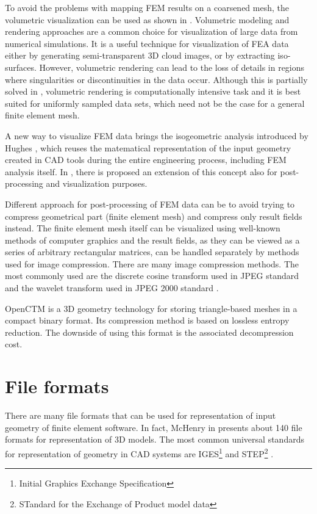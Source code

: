 To avoid the problems with mapping FEM results on a coarsened mesh, the volumetric visualization can be used as shown in \cite{Ueng2004}. Volumetric modeling and rendering approaches are a common choice for visualization of large data from numerical simulations. It is a useful technique for visualization of FEA data either by generating semi-transparent 3D cloud images, or by extracting iso-surfaces. However, volumetric rendering can lead to the loss of details in regions where singularities or discontinuities in the data occur. Although this is partially solved in \cite{Robaina2010}, volumetric rendering is computationally intensive task and it is best suited for uniformly sampled data sets, which need not be the case for a general finite element mesh.

A new way to visualize FEM data brings the isogeometric analysis introduced by Hughes \cite{Hughes2005}, which reuses the matematical representation of the input geometry created in CAD tools during the entire engineering process, including FEM analysis itself. In \cite{Stahl2017}, there is proposed an extension of this concept also for post-processing and visualization purposes.

Different approach for post-processing of FEM data can be to avoid trying to compress geometrical part (finite element mesh) and compress only result fields instead. The finite element mesh itself can be visualized using well-known methods of computer graphics and the result fields, as they can be viewed as a series of arbitrary rectangular matrices, can be handled separately by methods used for image compression. There are many image compression methods. The most commonly used are the discrete cosine transform \cite{Watson1994} used in JPEG standard and the wavelet transform used in JPEG 2000 standard \cite{Lui2001}.

OpenCTM \cite{OpenCTM2010} is a 3D geometry technology for storing triangle-based meshes in a compact binary format. Its compression method is based on lossless entropy reduction. The downside of using this format is the associated decompression cost.


\section{File formats}

There are many file formats that can be used for representation of input geometry of finite element software. In fact, McHenry in \cite{McHenry2008} presents about 140 file formats for representation of 3D models. The most common universal standards for representation of geometry in CAD systems are IGES\footnote{Initial Graphics Exchange Specification} \cite{Groton2006} and STEP\footnote{STandard for the Exchange of Product model data} \cite{Pratt2001}.

